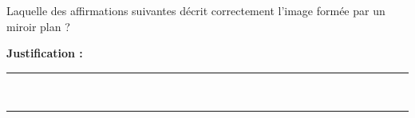 Laquelle des affirmations suivantes décrit correctement l'image formée par un miroir plan ?

\choices

\noindent\textbf{Justification :} \hrulefill \\[2.5ex]
\rule{\linewidth}{0.4pt} \\[2.5ex]
\rule{\linewidth}{0.4pt}
\vfill
